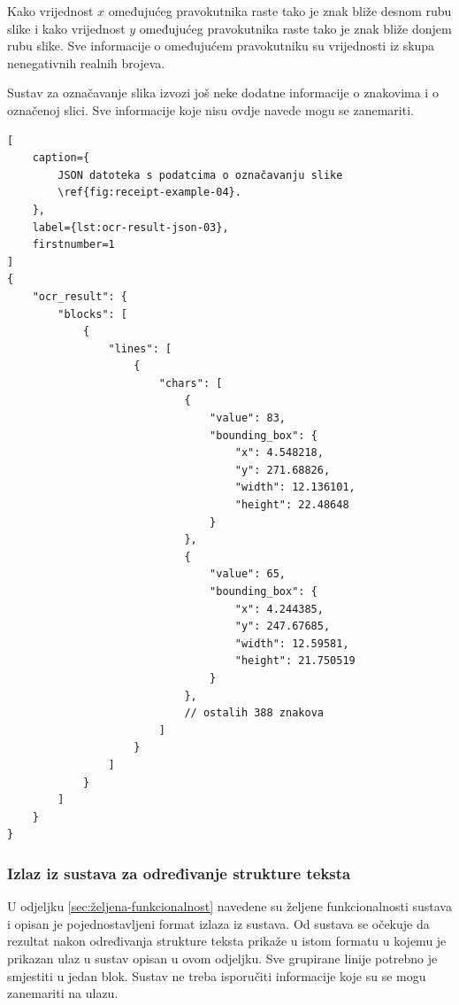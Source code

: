 \documentclass[times, utf8, zavrsni]{fer}
\begin{document}
Kako vrijednost $x$ omeđujućeg pravokutnika raste tako je znak bliže desnom rubu
slike i kako vrijednost $y$ omeđujućeg pravokutnika raste tako je znak bliže
donjem rubu slike. Sve informacije o omeđujućem pravokutniku su vrijednosti iz
skupa nenegativnih realnih brojeva.

Sustav za označavanje slika izvozi još neke dodatne informacije o znakovima i
o označenoj slici. Sve informacije koje nisu ovdje navede mogu se zanemariti.

\pagebreak

\begin{lstlisting}[
    caption={
        JSON datoteka s podatcima o označavanju slike
        \ref{fig:receipt-example-04}.
    },
    label={lst:ocr-result-json-03},
    firstnumber=1
]
{
    "ocr_result": {
        "blocks": [
            {
                "lines": [
                    {
                        "chars": [
                            {
                                "value": 83,
                                "bounding_box": {
                                    "x": 4.548218,
                                    "y": 271.68826,
                                    "width": 12.136101,
                                    "height": 22.48648
                                }
                            },
                            {
                                "value": 65,
                                "bounding_box": {
                                    "x": 4.244385,
                                    "y": 247.67685,
                                    "width": 12.59581,
                                    "height": 21.750519
                                }
                            },
                            // ostalih 388 znakova
                        ]
                    }
                ]
            }
        ]
    }
}
\end{lstlisting}


\subsubsection{Izlaz iz sustava za određivanje strukture teksta}
U odjeljku \ref{sec:željena-funkcionalnost} navedene su željene funkcionalnosti
sustava i opisan je pojednostavljeni format izlaza iz sustava. Od sustava se
očekuje da rezultat nakon određivanja strukture teksta prikaže u istom formatu
u kojemu je prikazan ulaz u sustav opisan u ovom odjeljku. Sve grupirane linije
potrebno je smjestiti u jedan blok. Sustav ne treba isporučiti informacije koje
su se mogu zanemariti na ulazu.
\end{document}
